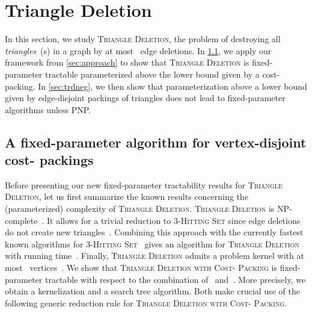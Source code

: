 \documentclass[envcountsame,numbook,smallextended]{svjour3}
\numberwithin{equation}{section}
\numberwithin{figure}{section}
\newcommand{\TAGP}{\textsc{Triangle Deletion with  Cost- Packing}}
\begin{document}
\section{Triangle Deletion}
\label{sec:triangle-free}

In this section, we study \textsc{Triangle Deletion}, the problem of destroying all \emph{triangles}~(s) in a graph by at most ~edge deletions.  In \cref{sec:trdpos}, we apply our framework from \cref{sec:approach} to show that \textsc{Triangle Deletion} is fixed-parameter tractable parameterized above the lower bound given by a cost- packing.  In \cref{sec:trdneg}, we then show that parameterization above a lower bound given by edge-disjoint packings of triangles does not lead to fixed-parameter algorithms unless PNP.

\subsection{A fixed-parameter algorithm  for vertex-disjoint cost- packings}\label{sec:trdpos}
Before presenting our new fixed-parameter tractability results for \textsc{Triangle Deletion}, let us first summarize the known results concerning the (parameterized)
complexity of \textsc{Triangle Deletion}.
\textsc{Triangle Deletion} is NP-complete~\cite{Yan81}. It allows for a trivial reduction to \textsc{3-Hitting Set} since edge deletions do not create new triangles~\cite{GGHN04}. Combining this approach with the currently fastest known algorithms for \textsc{3-Hitting Set}~\cite{wahl07,Bev14} gives an algorithm for \textsc{Triangle Deletion} with running time~. Finally, \textsc{Triangle Deletion} admits a problem kernel with at most ~vertices~\cite{BKM09}.
We show that \TAGP{} is fixed-parameter tractable with respect to
the combination of~ and~.
More precisely, we obtain a kernelization and a search tree algorithm.
Both make crucial use of the following generic reduction rule for \TAGP.
\end{document}
